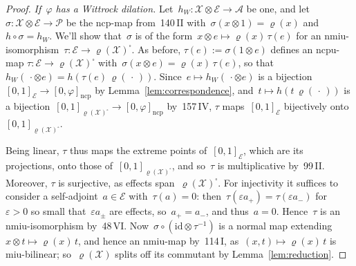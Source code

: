 \documentclass{article}
\theoremstyle{plain}
\theoremstyle{definition}
\begin{document}
\begin{proof}
\emph{If~$\varphi$ has a Wittrock dilation.}
Let~$h_W \colon \mathscr{X} \otimes \mathscr{E} \to \mathscr{A}$
    be one,
    and let~$\sigma \colon \mathscr{X} \otimes \mathscr{E} \to \mathscr{P}$
    be the ncp-map from~140\,II
    with~$\sigma(x \otimes 1) = \varrho(x)$ and~$h \circ \sigma = h_W$.
We'll show that~$\sigma$ is of the form~$x \otimes e \mapsto \varrho(x)\, \tau(e)$
    for an nmiu-isomorphism~$\tau \colon \mathscr{E} \to \varrho(\mathscr{X})^\square$.
As before,
    $\tau(e) := \sigma(1 \otimes e)$ defines an ncpu-map
    $\tau \colon \mathscr{E} \to \varrho(\mathscr{X})^\square$
    with~$\sigma(x \otimes e) = \varrho(x)\, \tau(e)$,
    so that~$h_W(\,\cdot \otimes e) = h(\tau(e)\, \varrho(\,\cdot\,))$.
Since~$e \mapsto h_W(\,\cdot \otimes e)$
    is a bijection~$[0,1]_{\mathscr{E}} \to [0,\varphi]_{\mathrm{ncp}}$
    by Lemma~\ref{lem:correspondence},
    and~$t \mapsto h(t\, \varrho(\,\cdot\,))$
    is a bijection~$[0,1]_{\varrho(\mathscr{X})^\square} \to [0,\varphi]_{\mathrm{ncp}}$
    by~157\,IV,
    $\tau$ maps~$[0,1]_{\mathscr{E}}$
    bijectively onto~$[0,1]_{\varrho(\mathscr{X})^\square}$.

Being linear, $\tau$ thus maps the extreme points of~$[0,1]_{\mathscr{E}}$,
    which are its projections,
    onto those of~$[0,1]_{\varrho(\mathscr{X})^\square}$,
    and so~$\tau$ is multiplicative by~99\,II.
Moreover, $\tau$ is surjective, as effects span~$\varrho(\mathscr{X})^\square$.
For injectivity it suffices to consider
    a self-adjoint~$a \in \mathscr{E}$ with~$\tau(a) = 0$:
    then~$\tau(\varepsilon a_+) = \tau(\varepsilon a_-)$
    for~$\varepsilon > 0$ so small that~$\varepsilon a_\pm$ are effects,
    so~$a_+ = a_-$, and thus~$a = 0$.
Hence~$\tau$ is an nmiu-isomorphism by~48\,VI.
Now~$\sigma \circ (\mathrm{id} \otimes \tau^{-1})$
    is a normal map extending~$x \otimes t \mapsto \varrho(x)\, t$,
    and hence an nmiu-map by~114\,I,
    as~$(x,t) \mapsto \varrho(x)\, t$ is miu-bilinear;
    so~$\varrho(\mathscr{X})$ splits off its commutant by Lemma~\ref{lem:reduction}.
\end{proof}
\end{document}
